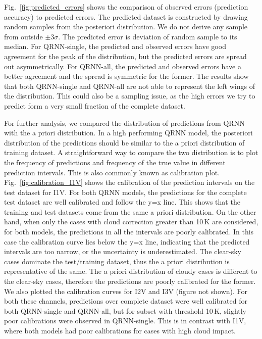 \documentclass[amt, manuscript]{copernicus}
\begin{document}
Fig.~\ref{fig:predicted_errors} shows the comparison of observed errors (prediction accuracy) to predicted errors. The predicted dataset is constructed by drawing random samples from the posteriori distribution. We do not derive any sample from outside $\pm3\sigma$.  The predicted error is deviation of random sample to its median. For QRNN-single, the predicted and observed errors have good agreement for the peak of the distribution, but the predicted errors are spread out asymmetrically. For QRNN-all, the predicted and observed errors have a better agreement and the spread is symmetric for the former. The results show that both QRNN-single and QRNN-all are not able to represent the left wings of the distribution. This could also be a sampling issue, as the high errors we try to predict form a very small fraction of the complete dataset.  

For further analysis, we compared the distribution of predictions from QRNN with the a priori distribution. In a  high performing QRNN model, the posteriori distribution of the predictions should be similar to the a priori distribution of training dataset. A straightforward way to compare the two distribution is to plot the frequency of predictions and frequency of the true value in different prediction intervals. This is also commonly known as calibration plot. Fig.~\ref{fig:calibration_I1V} shows the calibration of the prediction intervals on the test dataset for I1V. For both QRNN models, the predictions for the complete test dataset are well calibrated and follow the y=x line. This shows that the training and test datasets come from the same a priori distribution. On the other hand, when only the cases with  cloud correction greater than 10\,K are considered, for both models, the predictions in all the intervals are poorly calibrated. In this case the calibration curve lies below the y=x line, indicating that the predicted intervals are too narrow, or the uncertainty is underestimated. The clear-sky cases dominate the test/training dataset, thus the a priori distribution is representative of the same. The a priori distribution of cloudy cases is different to the clear-sky cases, therefore the predictions are poorly calibrated for the former. We also plotted the calibration curves for I2V and I3V (figure not shown). For both these channels, predictions over complete dataset were well calibrated for both QRNN-single and QRNN-all, but for subset with threshold 10\,K, slightly poor calibrations were observed in QRNN-single. This is in contrast with I1V, where both models had poor calibrations for cases with high cloud impact. 
\end{document}
